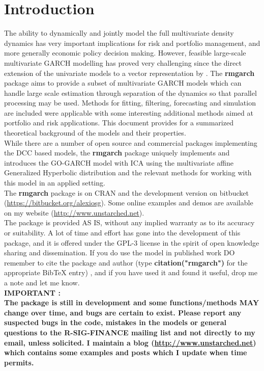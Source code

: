 \section{Introduction}
The ability to dynamically and jointly model the full multivariate density
dynamics has very important implications for risk and portfolio management,
and more generally economic policy decision making. However, feasible large-scale
multivariate GARCH modelling has proved very challenging since the direct extension
of the univariate models to a vector representation by \cite{Bollerslev1988}.
The {\bf rmgarch} package aims to provide a subset of multivariate GARCH models
which can handle large scale estimation through separation of the dynamics
so that parallel processing may be used. Methods for fitting, filtering,
forecasting and simulation are included were applicable with some interesting
additional methods aimed at portfolio and risk applications. This document provides
for a summarized theoretical background of the models and their properties.\\
While there are a number of open source and commercial packages implementing the
DCC based models, the {\bf rmgarch} package uniquely implements and introduces
the GO-GARCH model with ICA using the multivariate affine Generalized Hyperbolic
distribution and the relevant methods for working with this model in an applied setting.\\
The {\bf rmgarch} package is on CRAN and the development version on 
bitbucket (\url{https://bitbucket.org/alexiosg}). Some online examples and demos
are available on my website (\url{http://www.unstarched.net}).\\
The package is provided AS IS, without any implied warranty as to its accuracy
or suitability. A lot of time and effort has gone into the development of this
package, and it is offered under the GPL-3 license in the spirit of open knowledge
sharing and dissemination. If you do use the model in published work DO remember
to cite the package and author (type {\bf citation("rmgarch")} for the
appropriate BibTeX entry) , and if you have used it and found it useful, drop me
a note and let me know.\\
\textbf{ IMPORTANT :\\
The package is still in development and some functions/methods MAY change over time, 
and bugs are certain to exist. Please report any suspected bugs in the code, mistakes 
in the models or general questions to the R-SIG-FINANCE mailing list and not directly 
to my email, unless solicited. I maintain a blog (\url{http://www.unstarched.net}) 
which contains some examples and posts which I update when time permits.}
